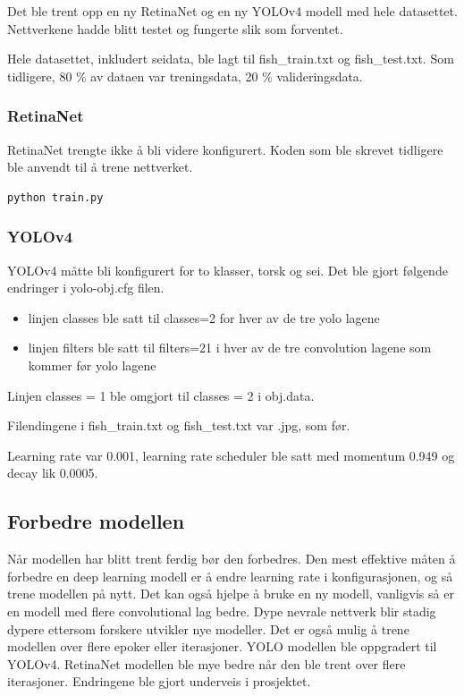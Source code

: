 Det ble trent opp en ny RetinaNet og en ny YOLOv4 modell med hele datasettet. Nettverkene hadde blitt testet og fungerte slik som forventet.

Hele datasettet, inkludert seidata, ble lagt til fish\_train.txt og fish\_test.txt. Som tidligere, 80 \% av dataen var treningsdata, 20 \% valideringsdata.

\subsubsection{RetinaNet}

RetinaNet trengte ikke å bli videre konfigurert. Koden som ble skrevet tidligere ble anvendt til å trene nettverket.

\begin{verbatim}
python train.py
\end{verbatim}

\subsubsection{YOLOv4}

YOLOv4 måtte bli konfigurert for to klasser, torsk og sei. Det ble gjort følgende endringer i yolo-obj.cfg filen.

\begin{itemize}
  \item linjen classes ble satt til classes=2 for hver av de tre yolo lagene
  \item linjen filters ble satt til filters=21 i hver av de tre convolution lagene som kommer før yolo lagene
\end{itemize}

Linjen classes = 1 ble omgjort til classes = 2 i obj.data. 

Filendingene i fish\_train.txt og fish\_test.txt var .jpg, som før.

Learning rate var 0.001, learning rate scheduler ble satt med momentum 0.949 og decay lik 0.0005.

\subsection{Forbedre modellen}

Når modellen har blitt trent ferdig bør den forbedres. Den mest effektive måten å forbedre en deep learning modell er å endre learning rate i konfigurasjonen, og så trene modellen på nytt. Det kan også hjelpe å bruke en ny modell, vanligvis så er en modell med flere convolutional lag bedre. Dype nevrale nettverk blir stadig dypere ettersom forskere utvikler nye modeller. Det er også mulig å trene modellen over flere epoker eller iterasjoner. YOLO modellen ble oppgradert til YOLOv4. RetinaNet modellen ble mye bedre når den ble trent over flere iterasjoner. Endringene ble gjort underveis i prosjektet. 

